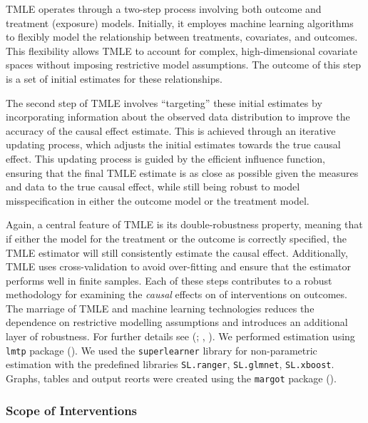 \documentclass[
  singlecolumn]{article}
\begin{document}
TMLE operates through a two-step process involving both outcome and
treatment (exposure) models. Initially, it employes machine learning
algorithms to flexibly model the relationship between treatments,
covariates, and outcomes. This flexibility allows TMLE to account for
complex, high-dimensional covariate spaces without imposing restrictive
model assumptions. The outcome of this step is a set of initial
estimates for these relationships.

The second step of TMLE involves ``targeting'' these initial estimates
by incorporating information about the observed data distribution to
improve the accuracy of the causal effect estimate. This is achieved
through an iterative updating process, which adjusts the initial
estimates towards the true causal effect. This updating process is
guided by the efficient influence function, ensuring that the final TMLE
estimate is as close as possible given the measures and data to the true
causal effect, while still being robust to model misspecification in
either the outcome model or the treatment model.

Again, a central feature of TMLE is its double-robustness property,
meaning that if either the model for the treatment or the outcome is
correctly specified, the TMLE estimator will still consistently estimate
the causal effect. Additionally, TMLE uses cross-validation to avoid
over-fitting and ensure that the estimator performs well in finite
samples. Each of these steps contributes to a robust methodology for
examining the \emph{causal} effects on of interventions on outcomes. The
marriage of TMLE and machine learning technologies reduces the
dependence on restrictive modelling assumptions and introduces an
additional layer of robustness. For further details see
(;
,
). We performed estimation using
\texttt{lmtp} package (). We used the \texttt{superlearner} library for non-parametric
estimation with the predefined libraries \texttt{SL.ranger},
\texttt{SL.glmnet}, \texttt{SL.xboost}. Graphs, tables and output reorts
were created using the \texttt{margot} package
().

\newpage{}

\subsubsection{Scope of Interventions}\label{scope-of-interventions}
\end{document}
